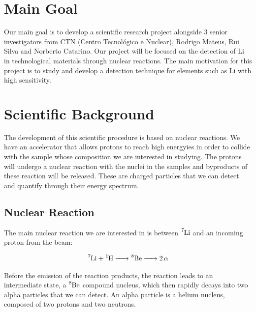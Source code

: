 \documentclass{article}
\begin{document}
\begin{multicols}{2}

\section{Main Goal}
    \label{sec:maingoal}

Our main goal is to develop a scientific research project alongside 3 senior investigators from CTN (Centro Tecnológico e Nuclear), Rodrigo Mateus, Rui Silva and Norberto Catarino.
Our project will be focused on the detection of Li in technological materials through nuclear reactions. The main motivation for this project is to study and develop a detection technique for elements such as Li with high sensitivity.

\section{Scientific Background}
    \label{sec:scientificbackground}

The development of this scientific procedure is based on nuclear reactions. We have an accelerator that allows protons to reach high energyies in order to collide with the sample whose composition we are interested in studying. The protons will undergo a nuclear reaction with the nuclei in the samples and byproducts of these reaction will be released. These are charged particles that we can detect and quantify through their energy spectrum.

\subsection{Nuclear Reaction}
    \label{sec:nuclearreactions}

The main nuclear reaction we are interested in is between $\ce{^7Li}$ and an incoming proton from the beam:

\begin{equation}
  \ce{^7Li + ^1H -> ^8Be -> 2\alpha}
\label{eq:reactionLi}
\end{equation}

Before the emission of the reaction products, the reaction leads to an intermediate state, a $\ce{^8Be}$ compound nucleus, which then rapidly decays into two alpha particles that we can detect.
An alpha particle is a helium nucleus, composed of two protons and two neutrons. %



\end{multicols}
\end{document}
